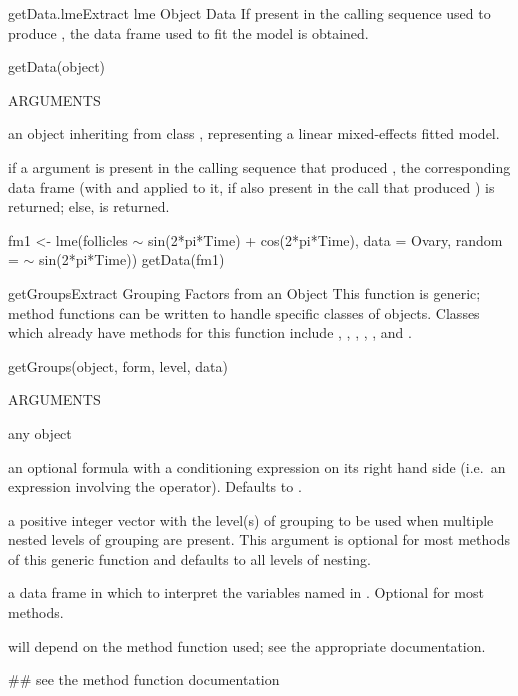 \documentclass[pdftex]{article} \usepackage{url,graphicx}
\renewcommand{\Twiddle}{\mbox{\(\sim\)}}
\begin{document}
\begin{Helpfile}{getData.lme}{Extract lme Object Data}
If present in the calling sequence used to produce , the
data frame used to fit the model is obtained.
\begin{Example}
getData(object)
\end{Example}
\begin{Argument}{ARGUMENTS}
\item[\Co{object:}]
an object inheriting from class , representing
a linear mixed-effects fitted model.
\end{Argument}
if a  argument is present in the calling sequence that
produced , the corresponding data frame (with
 and  applied to it, if also present in
the call that produced ) is returned;
else,  is returned.
\need 15pt
\vspace{-16pt} 
\begin{Example}
fm1 <- lme(follicles {\Twiddle} sin(2*pi*Time) + cos(2*pi*Time), data = Ovary,
           random = {\Twiddle} sin(2*pi*Time))
getData(fm1)
\end{Example}
\end{Helpfile}
\begin{Helpfile}{getGroups}{Extract Grouping Factors from an Object}
This function is generic; method functions can be written to handle
specific classes of objects. Classes which already have methods for
this function include , ,
, , , and .
\begin{Example}
getGroups(object, form, level, data)
\end{Example}
\begin{Argument}{ARGUMENTS}
\item[\Co{object:}]
any object
\item[\Co{form:}]
an optional formula with a conditioning expression on its
right hand side (i.e.\ an expression involving the \Co{|}
operator). Defaults to .
\item[\Co{level:}]
a positive integer vector with the level(s) of grouping to
be used when multiple nested levels of grouping are present. This
argument is optional for most methods of this generic function and
defaults to all levels of nesting.
\item[\Co{data:}]
a data frame in which to interpret the variables named in
. Optional for most methods.
\end{Argument}
will depend on the method function used; see the appropriate documentation.
\need 15pt
\vspace{-16pt} 
\begin{Example}
## see the method function documentation
\end{Example}
\end{Helpfile}
\end{document}

